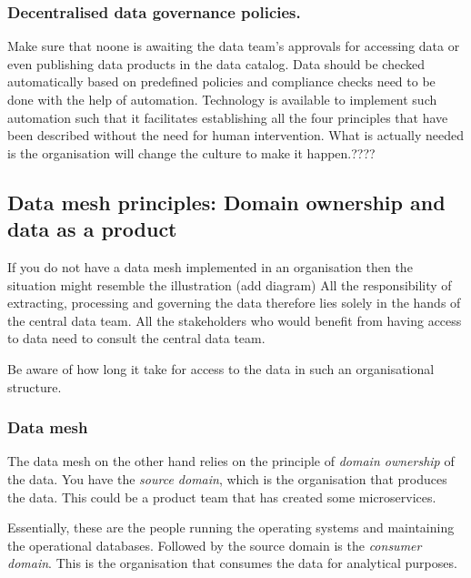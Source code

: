 \subsubsection{Decentralised data governance policies.}
Make sure that noone is awaiting the data team's approvals for accessing data or even publishing data products in the data catalog.
Data should be checked automatically based on predefined policies and compliance checks need to be done with the help of automation.
Technology is available to implement such automation such that it facilitates establishing all the four principles that have been described without the need for human intervention.
What is actually needed is the organisation will change the culture to make it happen.????

\subsection{Data mesh principles: Domain ownership and data as a product}
If you do not have a data mesh implemented in an organisation then the situation might resemble the illustration (add diagram)
All the responsibility of extracting, processing and governing the data therefore lies solely in the hands of the central data team.
All the stakeholders who would benefit from having access to data need to consult the central data team.

\begin{note}
    Be aware of how long it take for access to the data in such an organisational structure.
\end{note}

\subsubsection{Data mesh}
The data mesh on the other hand relies on the principle of \textit{domain ownership} of the data.
You have the \textit{source domain}, which is the organisation that produces the data.
This could be a product team that has created some microservices.

Essentially, these are the people running the operating systems and maintaining the operational databases.
Followed by the source domain is the \textit{consumer domain}.
This is the organisation that consumes the data for analytical purposes.

